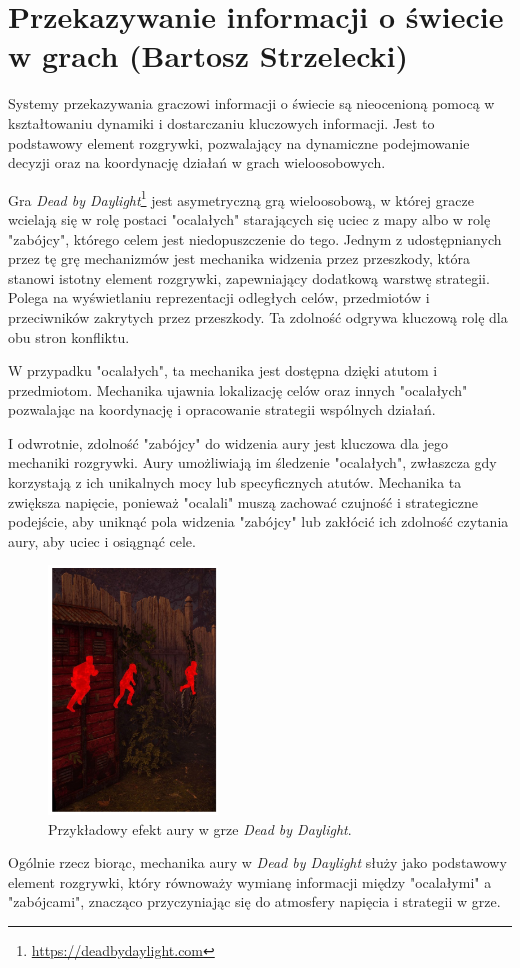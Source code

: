 \section{Przekazywanie informacji o świecie w grach (Bartosz Strzelecki)}\label{chap:dbd}
Systemy przekazywania graczowi informacji o świecie są nieocenioną pomocą w kształtowaniu dynamiki i dostarczaniu kluczowych informacji.
Jest to podstawowy element rozgrywki, pozwalający na dynamiczne podejmowanie decyzji oraz na koordynację działań w grach wieloosobowych.

Gra \textit{Dead by Daylight}\footnote{\url{https://deadbydaylight.com}} jest asymetryczną grą wieloosobową, w której gracze wcielają się w rolę postaci "ocalałych" starających się uciec
z mapy albo w rolę "zabójcy", którego celem jest niedopuszczenie do tego. Jednym z udostępnianych przez tę grę mechanizmów jest mechanika widzenia przez przeszkody, która stanowi istotny element rozgrywki, zapewniający
dodatkową warstwę strategii. Polega na wyświetlaniu reprezentacji odległych celów, przedmiotów i przeciwników
zakrytych przez przeszkody. Ta zdolność odgrywa kluczową rolę dla obu stron konfliktu.

W przypadku "ocalałych", ta mechanika jest dostępna dzięki atutom i przedmiotom. Mechanika ujawnia lokalizację celów oraz
innych "ocalałych" pozwalając na koordynację i opracowanie strategii wspólnych działań.

I odwrotnie, zdolność "zabójcy" do widzenia aury jest kluczowa dla jego mechaniki rozgrywki.
Aury umożliwiają im śledzenie "ocalałych", zwłaszcza gdy korzystają z ich unikalnych mocy lub specyficznych atutów.
Mechanika ta zwiększa napięcie, ponieważ "ocalali" muszą zachować czujność i strategiczne podejście,
aby uniknąć pola widzenia "zabójcy" lub zakłócić ich zdolność czytania aury, aby uciec i osiągnąć cele.

\begin{figure}[h]
\centering
\includegraphics[width=0.4\textwidth]{images/dbd}
\caption{Przykładowy efekt aury w grze \textit{Dead by Daylight}.}
\end{figure}
\FloatBarrier

Ogólnie rzecz biorąc, mechanika aury w \textit{Dead by Daylight} służy jako podstawowy element rozgrywki,
który równoważy wymianę informacji między "ocalałymi" a "zabójcami", znacząco przyczyniając się do atmosfery napięcia i strategii w grze.


